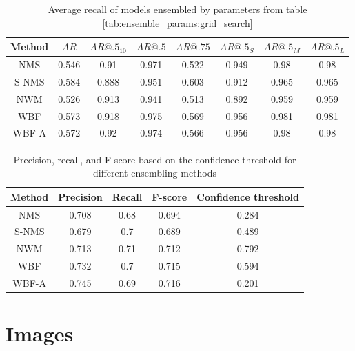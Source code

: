 \begin{table}[h]
    \centering
    \begin{tabular}{|c|c|c|c|c|c|c|c|}
        \hline
        Method & $AR$  & $AR@.5_{10}$ & $AR@.5$ & $AR@.75$ & $AR@.5_S$ & $AR@.5_M$ & $AR@.5_L$ \\ \hline
        NMS    & 0.546 & 0.91         & 0.971   & 0.522    & 0.949     & 0.98      & 0.98      \\ \hline
        S-NMS  & 0.584 & 0.888        & 0.951   & 0.603    & 0.912     & 0.965     & 0.965     \\ \hline
        NWM    & 0.526 & 0.913        & 0.941   & 0.513    & 0.892     & 0.959     & 0.959     \\ \hline
        WBF    & 0.573 & 0.918        & 0.975   & 0.569    & 0.956     & 0.981     & 0.981     \\ \hline
        WBF-A  & 0.572 & 0.92         & 0.974   & 0.566    & 0.956     & 0.98      & 0.98      \\ \hline
    \end{tabular}
    \caption{Average recall of models ensembled by parameters from table \ref{tab:ensemble_params:grid_search}}
    \label{tab:recall:grid_search}
\end{table}


\begin{table}[h]
    \begin{tabular}{|c|c|c|c|c|}
        \hline
        Method & Precision & Recall & F-score & Confidence threshold \\ \hline
        NMS    & 0.708     & 0.68   & 0.694   & 0.284                \\ \hline
        S-NMS  & 0.679     & 0.7    & 0.689   & 0.489                \\ \hline
        NWM    & 0.713     & 0.71   & 0.712   & 0.792                \\ \hline
        WBF    & 0.732     & 0.7    & 0.715   & 0.594                \\ \hline
        WBF-A  & 0.745     & 0.69   & 0.716   & 0.201                \\ \hline
    \end{tabular}
    \caption{Precision, recall, and F-score based on the confidence threshold for different ensembling methods}
    \label{tab:ensembling_prf:grid_search}
\end{table}

\chapter{Images}
\label{appendix:model_predictions}
